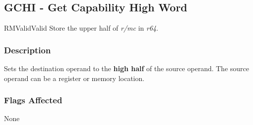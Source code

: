 \clearpage
{}
{}
\subsection*{GCHI - Get Capability High Word}

\begin{x86opcodetable}
  {RM}{Valid}{Valid}
  {Store the upper half of \emph{r/mc} in \emph{r64}.}
\end{x86opcodetable}

\begin{x86opentable}
\end{x86opentable}

\subsubsection*{Description}

Sets the destination operand to the \textbf{high half} of the source
operand.  The source operand can be a register or memory location.

\subsubsection*{Flags Affected}

None
